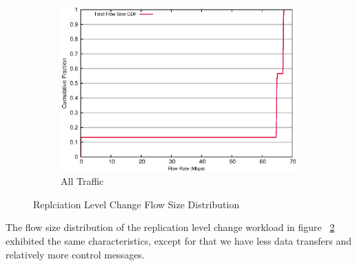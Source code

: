 \begin{figure}[!htpb]
\begin{subfigure}[b]{.55\linewidth}
	\includegraphics[width=.99\textwidth]{figures/replica_change/flow_size.eps}
	\caption{All Traffic}\label{fig:read_size:all}
   \end{subfigure}%
\caption{Replciation Level Change Flow Size Distribution}
\label{fig:replica_size}
\end{figure}

The flow size distribution of the replication level change workload in figure ~\ref{fig:replica_size} exhibited the same characteristics, except for that we have less data transfers and relatively more control messages. 

